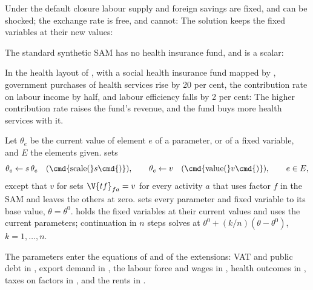 
Under the default closure labour supply and foreign savings are fixed, and can
be shocked; the exchange rate is free, and cannot:
The solution keeps the fixed variables at their new values:


The standard synthetic SAM has no health insurance fund, and  is a
scalar:


In the health layout of , with a social health insurance
fund mapped by , government purchases of health
services rise by 20 per cent, the contribution rate on labour income by half,
and labour efficiency falls by 2 per cent:
The higher contribution rate raises the fund's revenue, and the fund buys more
health services with it.


Let $\theta_e$ be the current value of element $e$ of a parameter, or of a
fixed variable, and $E$ the elements given.  sets
\begin{equation*}
\theta_e \leftarrow s\,\theta_e \quad\text{(\cmd{scale(}$s$\cmd{)})}, \qquad
\theta_e \leftarrow v \quad\text{(\cmd{value(}$v$\cmd{)})}, \qquad e \in E,
\end{equation*}
except that $v$\cmd{)} for  sets
$\V{tf}_{fa} = v$ for every activity $a$ that uses factor $f$ in the SAM and
leaves the others at zero.  sets every parameter and
fixed variable to its base value, $\theta = \theta^0$.  holds
the fixed variables at their current values and uses the current parameters;
continuation in $n$ steps solves at
$\theta^0 + (k/n)(\theta - \theta^0)$, $k = 1, \dots, n$.

The parameters enter the equations of  and of the
extensions: VAT and public debt in , export demand in
, the labour force and wages in ,
health outcomes in , taxes on factors in
, and the rents in .


\begin{alsosee}
\end{alsosee}
